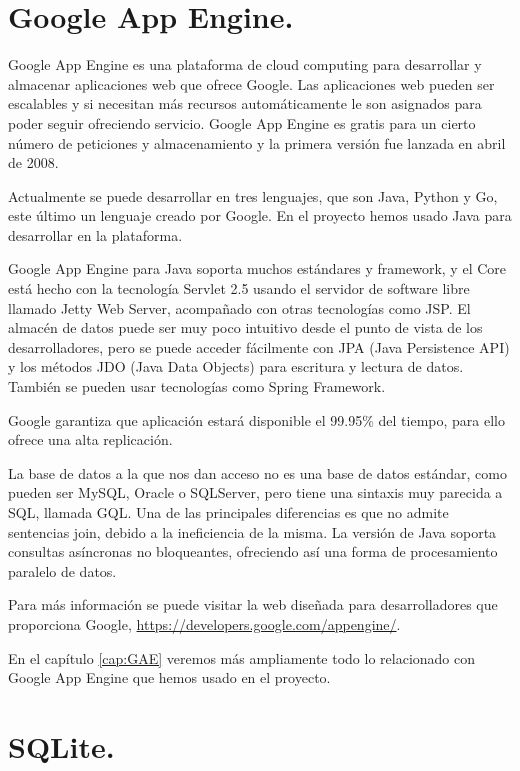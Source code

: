 \section{Google App Engine.}

Google App Engine es una plataforma de cloud computing para desarrollar y almacenar aplicaciones web que ofrece Google. Las aplicaciones web pueden ser escalables y si necesitan más recursos automáticamente le son asignados para poder seguir ofreciendo servicio. Google App Engine es gratis para un cierto número de peticiones y almacenamiento y la primera versión fue lanzada en abril de 2008.

Actualmente se puede desarrollar en tres lenguajes, que son Java, Python y Go, este último un lenguaje creado por Google. En el proyecto hemos usado Java para desarrollar en la plataforma. 

Google App Engine para Java soporta muchos estándares y framework, y el Core está hecho con la tecnología Servlet 2.5 usando el servidor de software libre llamado Jetty Web Server, acompañado con otras tecnologías como JSP. El almacén de datos puede ser muy poco intuitivo desde el punto de vista de los desarrolladores, pero se puede acceder fácilmente con JPA (Java Persistence API) y los métodos JDO (Java Data Objects) para escritura y lectura de datos. También se pueden usar tecnologías como Spring Framework.

Google garantiza que aplicación estará disponible el 99.95\% del tiempo, para ello ofrece una alta replicación.

La base de datos a la que nos dan acceso no es una base de datos estándar, como pueden ser MySQL, Oracle o SQLServer, pero tiene una sintaxis muy parecida a SQL, llamada GQL. Una de las principales diferencias es que no admite sentencias join, debido a la ineficiencia de la misma. La versión de Java soporta consultas asíncronas no bloqueantes, ofreciendo así una forma de procesamiento paralelo de datos.

Para más información se puede visitar la web diseñada para desarrolladores que proporciona Google, \url{https://developers.google.com/appengine/}. 

En el capítulo \ref{cap:GAE} veremos más ampliamente todo lo relacionado con Google App Engine que hemos usado en el proyecto.

\section{SQLite.}

